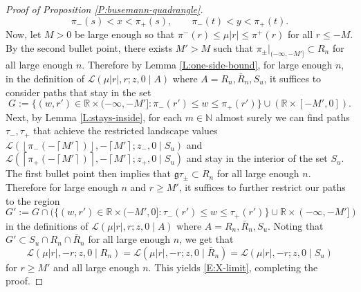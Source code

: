 \documentclass[10pt,a4paper]{amsart}
\newcommand{\N}{\mathbb{N}}
\newcommand{\R}{\mathbb{R}}
\newcommand{\X}{\times}
\newcommand{\cL}{\mathcal{L}}
\newcommand{\cl}[1]{{\left\lceil #1 \right\rceil}}
\newcommand{\fl}[1]{{\left\lfloor #1 \right\rfloor}}
\begin{document}
\begin{proof}[Proof of Proposition \ref{P:busemann-quadrangle}]
	\begin{equation}
\pi_-(s) < x < \pi_+(s), \qquad  \pi_-(t) < y < \pi_+(t).
	\end{equation}
	Now, let $M > 0$ be large enough so that $\pi^-(r) \le \mu |r| \le \pi^+(r)$ for all $r \le -M$. By the second bullet point, there exists $M' > M$ such that $\pi_\pm|_{(-\infty, -M']} \subset R_n$ for all large enough $n$. Therefore by Lemma \ref{L:one-side-bound}, for large enough $n$, in the definition of 
	$
	\cL(\mu|r|, r; z, 0 \mid A)
	$
	where $A = R_n, \bar R_n, S_u$,
	it suffices to consider paths that stay in the set
	$$
	G := \{(w, r') \in \R \X (-\infty, -M'] : \pi_-(r') \le w \le \pi_+(r')\} \cup (\R\X [-M', 0]).
	$$
	Next, by Lemma \ref{L:stays-inside}, for each $m \in \N$ almost surely we can find paths $\tau_-, \tau_+$ that achieve the restricted landscape values
	$\cL(\fl{\pi_-(-\cl{M'})}, -\cl{M'}; z_-, 0 \mid S_u)$ and 	$\cL(\cl{\pi_+(-\cl{M'})}, -\cl{M'}; z_+, 0 \mid S_u)$ and stay in the interior of the set $S_u$. The first bullet point then implies that $\mathfrak{g} \tau_\pm \subset R_n$ for all large enough $n$. Therefore for large enough $n$ and $r \ge M'$, it suffices to further restrict our paths to the region
	$$
	G' := G \cap (\{(w, r') \in \R \X (-M', 0] : \tau_-(r') \le w \le \tau_+(r')\} \cup \R\X (-\infty, -M'])
	$$
	in the definitions of $
	\cL(\mu|r|, r; z, 0 \mid A)
	$
	where $A = R_n, \bar R_n, S_u$.
	Noting that $G' \subset S_u \cap R_n \cap \bar R_n$ for all large enough $n$, we get that 
	$$
	\cL(\mu|r|, -r; z, 0 \mid R_n) = \cL(\mu|r|, -r; z, 0 \mid \bar R_n)= \cL(\mu|r|, -r; z, 0 \mid S_u)
	$$
	for $r \ge M'$ and all large enough $n$. This yields \eqref{E:X-limit}, completing the proof.
\end{proof}
\end{document}
